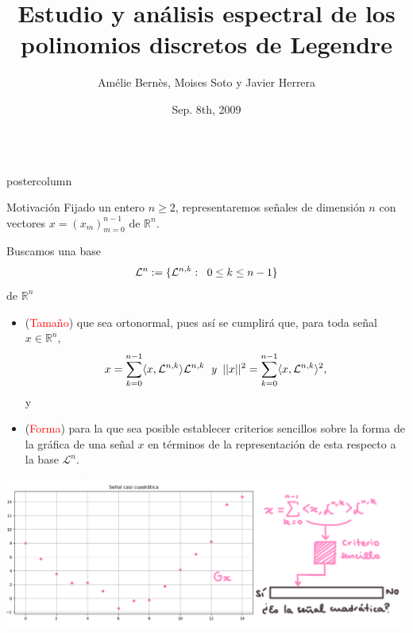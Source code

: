 \documentclass[final,hyperref={pdfpagelabels=false}]{beamer}
\title{\huge Estudio y an\'alisis espectral de los polinomios discretos de Legendre}
\author{Am\'elie Bern\`es, Moises Soto y Javier Herrera}
\institute[BUAP]{Benemerita Universidad Autonoma de Puebla}
\date[Sep. 8th, 2009]{Sep. 8th, 2009}
\newcommand{\IR}{\mathbb{R}}
\newcommand{\suma}[3]{\sum\limits_{#1}^{#2}#3} %
\newcommand{\cali}[1]{\mathcal{#1}} %
\newlength{\columnheight}
\begin{document}
\begin{frame}
  \begin{columns}
    \begin{column}{.49\textwidth}
      \begin{beamercolorbox}[center,wd=\textwidth]{postercolumn}
                              
            \begin{block}{Motivaci\'on}
            Fijado un entero $n \geq 2$, representaremos se\~nales
            de dimensi\'on $n$ con vectores $x = (x_{m})_{m=0}^{n-1}$
            de $\IR^{n}$.
     
            Buscamos una base
            $$\cali{L}^{n} := \{ \cali{L}^{n,k} : \hspace{0.2cm} 0 \leq k \leq n-1 \}$$
            de $\IR^{n}$
              \begin{itemize}
              
             \item (\textcolor{red}{Tama\~no}) 
			que sea ortonormal, pues as\'i se cumplir\'a que,
			para toda se\~nal $x \in \IR^{n}$, 
			\[
			x = \suma{k=0}{n-1}{\langle x, \cali{L}^{n,k} \rangle \cali{L}^{n,k}}
			\hspace{0.2cm} \textit{y} \hspace{0.2cm}
			||x||^{2} = \suma{k=0}{n-1}{\langle x, \cali{L}^{n,k} \rangle^{2}},
			\]
			y
	           
	        \item (\textcolor{red}{Forma}) para la que sea posible establecer criterios
			sencillos sobre la forma de la gr\'afica de una se\~nal $x$ en t\'erminos
			de la representaci\'on de esta respecto a la base $\cali{L}^{n}$.
               \end{itemize}
               
            \includegraphics[width=0.95\linewidth]{cuadr2}
            \end{block}
            \vfill
            

\end{beamercolorbox}
\end{column}
\end{columns}
\end{frame}
\end{document}
